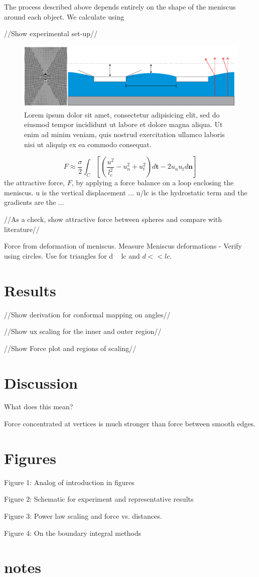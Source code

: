 \documentclass[twocolumn,prl]{revtex4-1}
\begin{document}
	The process described above depends entirely on the shape of the meniscus around each object. We calculate using 


//Show experimental set-up//
\begin{figure}[htb!]

\includegraphics{Figures/Fig2.pdf}
\caption{Lorem ipsum dolor sit amet, consectetur adipisicing elit, sed do eiusmod tempor incididunt ut labore et dolore magna aliqua. Ut enim ad minim veniam, quis nostrud exercitation ullamco laboris nisi ut aliquip ex ea commodo consequat.}
\end{figure}


\begin{equation}\label{eqn:forcebalance}
F \approx \frac{\sigma}{2} \int _C [(\frac{u^2}{l_c^2}- u_n^2 +u_t^2 )d\textbf{t} - 2u_n u_t d\textbf{n}]
\end{equation}
	the attractive force, $F$, by applying a force balance on a loop enclosing the meniscus\cite{he2013capillary}. u is the vertical displacement ... u/lc is the hydrostatic term and the gradients are the ...



//As a check, show attractive force between spheres and compare with literature//

Force from deformation of meniscus. Measure Meniscus deformations - Verify using circles. Use for triangles for d ~ lc and $d << lc$.

\section{Results}
//Show derivation for conformal mapping on angles//

//Show ux scaling for the inner and outer region//

//Show Force plot and regions of scaling//

\section{Discussion}
What does this mean?

Force concentrated at vertices is much stronger than force between smooth edges.

\section{Figures}
Figure 1: Analog of introduction in figures

Figure 2: Schematic for experiment and representative results 

Figure 3: Power law scaling and force vs. distances.

Figure 4: On the boundary integral methods

\section{notes}




\end{document}
